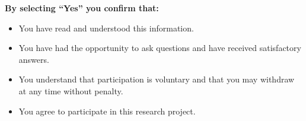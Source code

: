 \documentclass[letterpaper, 10pt]{article}
\begin{document}
\vspace{0.5\baselineskip}
\begin{panelbox}
\textbf{\color{Red} By selecting ``Yes'' you confirm that:}
\begin{itemize}[leftmargin=*]
\item You have read and understood this information.

\item You have had the opportunity to ask questions and have
    received satisfactory answers.

\item You understand that participation is voluntary and
    that you may withdraw at any time without penalty.

\item You agree to participate in this research project.
\end{itemize}
\end{panelbox}
\end{document}
